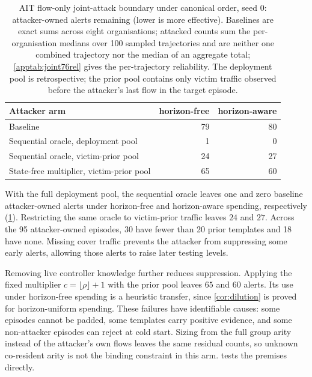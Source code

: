 \documentclass[conference]{IEEEtran}
\begin{document}
\begin{table}[t]
\centering
\caption{AIT flow-only joint-attack boundary under canonical order, seed 0: attacker-owned alerts
remaining (lower is more effective). Baselines are exact sums across eight organisations; attacked
counts sum the per-organisation medians over 100 sampled trajectories and are neither one combined
trajectory nor the median of an aggregate total; \cref{apptab:joint76rel} gives the per-trajectory
reliability. The deployment pool is retrospective; the prior pool
contains only victim traffic observed before the attacker's last flow in the target episode.}
\label{tab:aitboundary}
\footnotesize
\setlength{\tabcolsep}{3pt}
\begin{tabular}{@{}lrr@{}}
\toprule
Attacker arm & horizon-free & horizon-aware \\
\midrule
Baseline & 79 & 80 \\
Sequential oracle, deployment pool & 1 & 0 \\
Sequential oracle, victim-prior pool & 24 & 27 \\
State-free multiplier, victim-prior pool & 65 & 60 \\
\bottomrule
\end{tabular}
\end{table}

With the full deployment pool, the sequential oracle leaves one and zero baseline attacker-owned
alerts under horizon-free and horizon-aware spending, respectively (\cref{tab:aitboundary}).
Restricting the same oracle to victim-prior traffic leaves $24$ and $27$. Across the 95
attacker-owned episodes, 30 have fewer than 20 prior templates and 18 have none. Missing cover
traffic prevents the attacker from suppressing some early alerts, allowing those alerts to raise
later testing levels.

Removing live controller knowledge further reduces suppression. Applying the fixed multiplier
$c=\lfloor\rho\rfloor+1$ with the prior pool leaves $65$ and $60$ alerts. Its use under
horizon-free spending is a heuristic transfer, since \cref{cor:dilution} is proved for
horizon-uniform spending. These failures have identifiable causes: some episodes cannot be padded,
some templates carry positive evidence, and some non-attacker episodes can reject at cold start.
Sizing from the full group arity instead of the attacker's own flows leaves the same residual
counts, so unknown co-resident arity is not the binding constraint in this arm.
 tests the premises directly.
\end{document}
